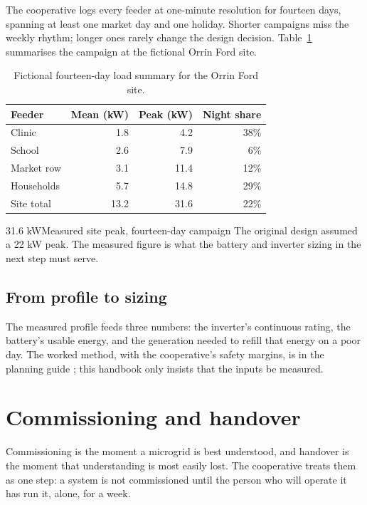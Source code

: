 The cooperative logs every feeder at one-minute resolution for fourteen days, spanning
at least one market day and one holiday. Shorter campaigns miss the weekly rhythm;
longer ones rarely change the design decision. Table~\ref{tab:load-summary} summarises
the campaign at the fictional Orrin Ford site.

\begin{table}[h]
\centering
\caption{Fictional fourteen-day load summary for the Orrin Ford site.}
\label{tab:load-summary}
\begin{tabular}{lrrr}
\toprule
Feeder & Mean (kW) & Peak (kW) & Night share \\
\midrule
Clinic & 1.8 & 4.2 & 38\% \\
School & 2.6 & 7.9 & 6\% \\
Market row & 3.1 & 11.4 & 12\% \\
Households & 5.7 & 14.8 & 29\% \\
\midrule
Site total & 13.2 & 31.6 & 22\% \\
\bottomrule
\end{tabular}
\end{table}

\begin{metric}{31.6 kW}{Measured site peak, fourteen-day campaign}
The original design assumed a 22 kW peak. The measured figure is what the battery
and inverter sizing in the next step must serve.
\end{metric}

\subsection{From profile to sizing}

The measured profile feeds three numbers: the inverter's continuous rating, the
battery's usable energy, and the generation needed to refill that energy on a poor
day. The worked method, with the cooperative's safety margins, is in the planning
guide \cite{coop-sizing}; this handbook only insists that the inputs be measured.


\section{Commissioning and handover}
\label{ch:handover}

Commissioning is the moment a microgrid is best understood, and handover is the moment
that understanding is most easily lost. The cooperative treats them as one step: a
system is not commissioned until the person who will operate it has run it, alone, for
a week.

